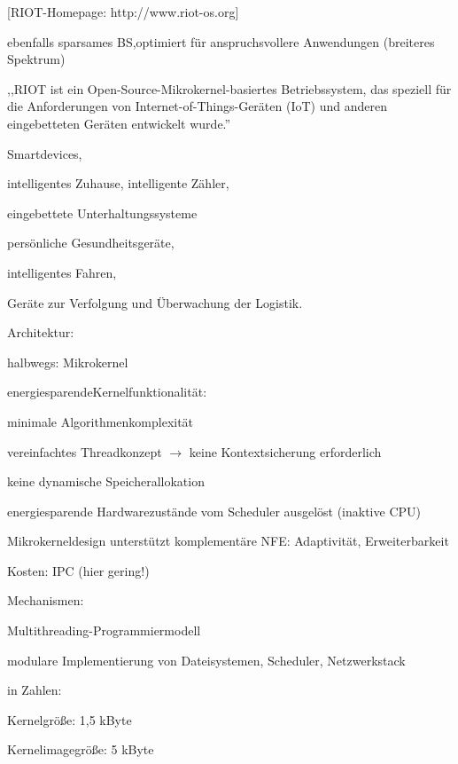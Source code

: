 \documentclass[a4paper]{article}
\begin{document}
\begin{multicols}{3}
    {[}RIOT-Homepage: http://www.riot-os.org{]}

    \begin{itemize*}
        \item
        ebenfalls sparsames BS,optimiert für anspruchsvollere Anwendungen
        (breiteres Spektrum)
        \item
        ,,RIOT ist ein Open-Source-Mikrokernel-basiertes Betriebssystem, das
        speziell für die Anforderungen von Internet-of-Things-Geräten (IoT)
        und anderen eingebetteten Geräten entwickelt wurde.''
        \begin{itemize*}
            \item Smartdevices,
            \item intelligentes Zuhause, intelligente Zähler,
            \item eingebettete Unterhaltungssysteme
            \item persönliche Gesundheitsgeräte,
            \item intelligentes Fahren,
            \item Geräte zur Verfolgung und Überwachung der Logistik.
        \end{itemize*}
        \item
        Architektur:
        \begin{itemize*}
            \item halbwegs: Mikrokernel
            \item energiesparendeKernelfunktionalität:
            \begin{itemize*}
                \item minimale Algorithmenkomplexität
                \item vereinfachtes Threadkonzept $\rightarrow$ keine Kontextsicherung erforderlich
                \item keine dynamische Speicherallokation
                \item energiesparende Hardwarezustände vom Scheduler ausgelöst (inaktive CPU)
            \end{itemize*}
            \item Mikrokerneldesign unterstützt komplementäre NFE: Adaptivität, Erweiterbarkeit
            \item Kosten: IPC (hier gering!)
        \end{itemize*}
        \item
        Mechanismen:
        \begin{itemize*}
            \item Multithreading-Programmiermodell
            \item modulare Implementierung von Dateisystemen, Scheduler, Netzwerkstack
        \end{itemize*}
        \item
        in Zahlen:
        \begin{itemize*}
            \item Kernelgröße: 1,5 kByte
            \item Kernelimagegröße: 5 kByte
        \end{itemize*}
    \end{itemize*}


\end{multicols}
\end{document}
